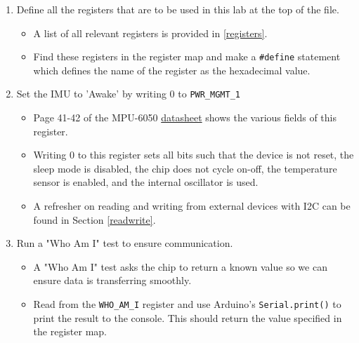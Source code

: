 \documentclass{article}
\begin{document}
        \begin{enumerate}
            \item Define all the registers that are to be used in this lab at the top of the file.
            \begin{itemize}
                \item A list of all relevant registers is provided in \ref{registers}.
                \item Find these registers in the register map and make a \texttt{\#define} statement which defines the name of the register as the hexadecimal value. 
            \end{itemize}
            \item Set the IMU to 'Awake' by writing 0 to \texttt{PWR\_MGMT\_1}
            \begin{itemize}
                \item Page 41-42 of the MPU-6050 \href{https://cdn.sparkfun.com/datasheets/Sensors/Accelerometers/RM-MPU-6000A.pdf}{datasheet} shows the various fields of this register.
                \item Writing 0 to this register sets all bits such that the device is not reset, the sleep mode is disabled, the chip does not cycle on-off, the temperature sensor is enabled, and the internal oscillator is used.
                \item A refresher on reading and writing from external devices with I2C can be found in Section \ref{readwrite}.
            \end{itemize}
            \item Run a "Who Am I" test to ensure communication.
            \begin{itemize}
                \item A "Who Am I" test asks the chip to return a known value so we can ensure data is transferring smoothly.
                \item Read from the \texttt{WHO\_AM\_I} register and use Arduino's \texttt{Serial.print()} to print the result to the console. This should return the value specified in the register map. 
            \end{itemize}
        \end{enumerate}
\end{document}

